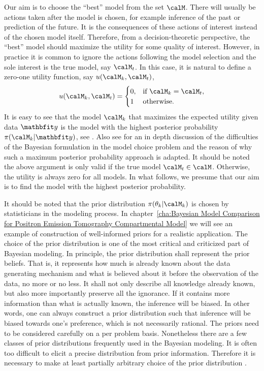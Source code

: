 Our aim is to choose the ``best'' model from the set $\calM$. There will
usually be actions taken after the model is chosen, for example inference of
the past or prediction of the future. It is the consequences of these actions
of interest instead of the chosen model itself. Therefore, from a
decision-theoretic perspective, the ``best'' model should maximize the utility
for some quality of interest. However, in practice it is common to ignore the
actions following the model selection and the sole interest is the true model,
say $\calM_t$. In this case, it is natural to define a zero-one utility
function, say $u(\calM_k,\calM_t)$,
\begin{equation}
  u(\calM_k,\calM_t) =
  \begin{cases}
    0, &\text{if } \calM_k = \calM_t,\\
    1  &\text{otherwise.}
  \end{cases}
\end{equation}
It is easy to see that the model $\calM_k$ that maximizes the expected utility
given data $\data$ is the model with the highest posterior probability
$\pi(\calM_k|\data)$, see \cite[][chap.~6]{Bernardo:1994vd}. Also see
\cite[][sec.~7.2.1]{Robert:2007tc} for an in depth discussion of the
difficulties of the Bayesian formulation in the model choice problem and the
reason of why such a maximum posterior probability approach is adapted. It
should be noted the above argument is only valid if the true model $\calM_t
\in \calM$. Otherwise, the utility is always zero for all models. In what
follows, we presume that our aim is to find the model with the highest
posterior probability.

It should be noted that the prior distribution $\pi(\theta_k|\calM_k)$ is
chosen by statisticians in the modeling process. In chapter~\ref{cha:Bayesian
  Model Comparison for Positron Emission Tomography Compartmental Model} we
will see an example of construction of well-informed priors for a realistic
application. The choice of the prior distribution is one of the most critical
and criticized part of Bayesian modeling. In principle, the prior distribution
shall represent the prior beliefs. That is, it represents how much is already
known about the data generating mechanism and what is believed about it before
the observation of the data, no more or no less. It shall not only describe
all knowledge already known, but also more importantly preserve all the
ignorance. If it contains more information than what is actually known, the
inference will be biased. In other words, one can always construct a prior
distribution such that inference will be biased towards one's preference,
which is not necessarily rational. The priors need to be considered carefully
on a per problem basis. Nonetheless there are a few classes of prior
distributions frequently used in the Bayesian modeling. It is often too
difficult to elicit a precise distribution from prior information. Therefore
it is necessary to make at least partially arbitrary choice of the prior
distribution \cite[][chap.~3]{Robert:2007tc}\cite{Kass:1995vb}.

